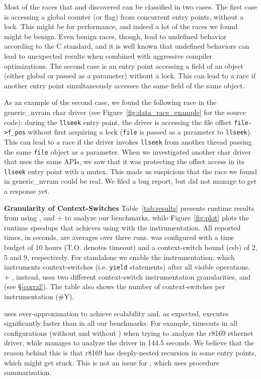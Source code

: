 Most of the races that \whoop and \corral discovered can be classified in two cases. The first case is accessing a global counter (or flag) from concurrent entry points, without a lock. This might be for performance, and indeed a lot of the races we found might be benign. Even benign races, though, lead to undefined behavior according to the C standard, and it is well known that undefined behaviors can lead to unexpected results when combined with aggressive compiler optimizations. The second case is an entry point accessing a field of an object (either global or passed as a parameter) without a lock. This can lead to a race if another entry point simultaneously accesses the same field of the same object.

As an example of the second case, we found the following race in the generic\_nvram char driver (see Figure~\ref{fig:data_race_example} for the source code): during the \texttt{llseek} entry point, the driver is accessing the file offset \texttt{file->f\_pos} without first acquiring a lock (\texttt{file} is passed as a parameter to \texttt{llseek}). This can lead to a race if the driver invokes \texttt{llseek} from another thread passing the same \texttt{file} object as a parameter. When we investigated another char driver that uses the same APIs, we saw that it was protecting the offset access in its \texttt{llseek} entry point with a mutex. This made us suspicious that the race we found in generic\_nvram could be real. We filed a bug report, but did not manage to get a response yet.

\medskip\noindent\textbf{Granularity of Context-Switches }
%
Table~\ref{tab:results} presents runtime results from using \whoop, \corral and \whoop + \corral to analyze our benchmarks, while Figure~\ref{fig:plot} plots the runtime speedups that \corral achieves using \whoop with the \yieldmr instrumentation. All reported times, in seconds, are averages over three runs. \corral was configured with a time budget of 10 hours (T.O. denotes timeout) and a context-switch bound (csb) of 2, 5 and 9, respectively. For standalone \corral we enable the \yieldall instrumentation, which instruments context-switches (i.e. \texttt{yield} statements) after all visible operations. \whoop + \corral, instead, uses two different context-switch instrumentation granularities, \yieldcoarse and \yieldmr (see \S\ref{corral}). The table also shows the number of context-switches per instrumentation (\#Y).

\whoop uses over-approximation to achieve scalability and, as expected, executes significantly faster than \corral in all our benchmarks. For example, \corral timeouts in all configurations (without and without \whoop) when trying to analyze the r8169 ethernet driver, while \whoop manages to analyze the driver in 144.5 seconds. We believe that the reason behind this is that r8169 has deeply-nested recursion in some entry points, which might get \corral stuck. This is not an issue for \whoop, which uses procedure summarization.

